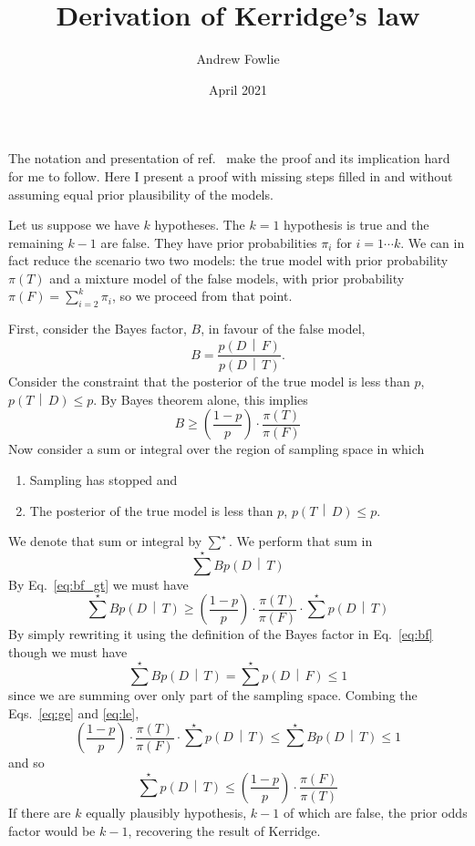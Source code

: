 \documentclass[12pt]{article}
\title{Derivation of Kerridge's law}
\author{Andrew Fowlie}
\date{April 2021}
\affil{Nanjing Normal University}
\newcommand{\refcite}[1]{ref.~\cite{#1}}
\newcommand{\given}{\, \middle| \,}
\newcommand{\prob}[2]{p\left(#1 \given #2 \right)}
\newcommand{\refeq}[1]{Eq.~\ref{#1}}
\newcommand{\refeqs}[2]{Eqs.~\ref{#1} and \ref{#2}}
\begin{document}
\maketitle


%
%

The notation and presentation of \refcite{kerridge1963} make the proof and its implication hard for me to follow. Here I present a proof with missing steps filled in and without assuming equal prior plausibility of the models.

Let us suppose we have $k$ hypotheses. The $k = 1$ hypothesis is true and the remaining $k - 1$ are false. They have prior probabilities $\pi_i$ for $i = 1 \cdots k$. We can in fact reduce the scenario two two models: the true model with prior probability $\pi(T)$ and a mixture model of the false models, with prior probability $\pi(F) = \sum_{i=2}^k \pi_i$, so we proceed from that point.

First, consider the Bayes factor, $B$, in favour of the false model,
\begin{equation}\label{eq:bf}
B = \frac{\prob{D}{F}}{\prob{D}{T}}.
\end{equation}
Consider the constraint that the posterior of the true model is less than $p$, $\prob{T}{D} \le p$. By Bayes theorem alone, this implies
\begin{equation}\label{eq:bf_gt}
B \ge \left(\frac{1 - p}{p}\right) \cdot \frac{\pi(T)}{\pi(F)}
\end{equation}
Now consider a sum or integral over the region of sampling space in which
\begin{enumerate}
    \item Sampling has stopped and
    \item The posterior of the true model is less than $p$, $\prob{T}{D} \le p$. 
\end{enumerate}
We denote that sum or integral by $\sum^\star$. We perform that sum in
\begin{equation}
\sum^\star B \prob{D}{T}
\end{equation}
By \refeq{eq:bf_gt} we must have 
\begin{equation}\label{eq:ge}
\sum^\star B \prob{D}{T} \ge  \left(\frac{1 - p}{p}\right) \cdot \frac{\pi(T)}{\pi(F)} \cdot  \sum^\star \prob{D}{T}
\end{equation}
By simply rewriting it using the definition of the Bayes factor in \refeq{eq:bf} though we must have
\begin{equation}\label{eq:le}
\sum^\star B \prob{D}{T} = \sum^\star \prob{D}{F} \le 1
\end{equation}
since we are summing over only part of the sampling space. Combing the \refeqs{eq:ge}{eq:le},
\begin{equation}
\left(\frac{1 - p}{p}\right) \cdot \frac{\pi(T)}{\pi(F)} \cdot \sum^\star \prob{D}{T} \le \sum^\star B \prob{D}{T} \le 1
\end{equation}
and so 
\begin{equation}
\sum^\star \prob{D}{T} \le \left(\frac{1 - p}{p}\right) \cdot\frac{\pi(F)}{\pi(T)} 
\end{equation}
If there are $k$ equally plausibly hypothesis, $k-1$ of which are false, the prior odds factor would be $k-1$, recovering the result of Kerridge.
\end{document}
